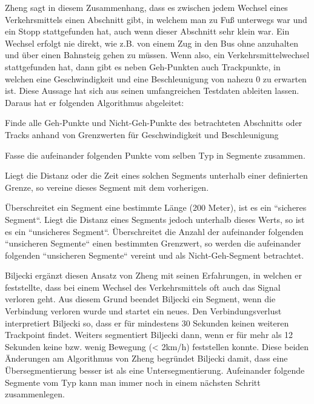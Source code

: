 Zheng sagt in diesem Zusammenhang, dass es zwischen jedem Wechsel eines Verkehrsmittels einen Abschnitt gibt, in welchem man zu Fuß unterwegs war und ein Stopp stattgefunden hat, auch wenn dieser Abschnitt sehr klein war. Ein Wechsel erfolgt nie direkt, wie z.B. von einem Zug in den Bus ohne anzuhalten und über einen Bahnsteig gehen zu müssen. Wenn also, ein Verkehrsmittelwechsel stattgefunden hat, dann gibt es neben Geh-Punkten auch Trackpunkte, in welchen eine Geschwindigkeit und eine Beschleunigung von nahezu 0 zu erwarten ist. Diese Aussage hat sich aus seinen umfangreichen Testdaten ableiten lassen. Daraus hat er folgenden Algorithmus abgeleitet:  \cite{zheng_understanding_2010}

\begin{pitemize}
\item Finde alle Geh-Punkte und Nicht-Geh-Punkte des betrachteten Abschnitts oder Tracks anhand von Grenzwerten für Geschwindigkeit und Beschleunigung 
\item Fasse die aufeinander folgenden Punkte vom selben Typ in Segmente zusammen.
\item Liegt die Distanz oder die Zeit eines solchen Segments unterhalb einer definierten Grenze, so vereine dieses Segment mit dem vorherigen.
\item Überschreitet ein Segment eine bestimmte Länge (200 Meter), ist es ein ``sicheres Segment``. Liegt die Distanz eines Segments jedoch unterhalb dieses Werts, so ist es ein ``unsicheres Segment``. Überschreitet die Anzahl der aufeinander folgenden ``unsicheren Segmente`` einen bestimmten Grenzwert, so werden die  aufeinander folgenden ``unsicheren Segmente`` vereint und als Nicht-Geh-Segment betrachtet.
\end{pitemize}

Biljecki ergänzt diesen Ansatz von Zheng mit seinen Erfahrungen, in welchen er feststellte, dass bei einem Wechsel des Verkehrsmittels oft auch das Signal verloren geht. Aus diesem Grund beendet Biljecki ein Segment, wenn die Verbindung verloren wurde und startet ein neues. Den Verbindungsverlust interpretiert Biljecki so, dass er für mindestens 30 Sekunden keinen weiteren Trackpoint findet. Weiters segmentiert Biljecki dann, wenn er für mehr als 12 Sekunden keine bzw. wenig Bewegung (< 2km/h) feststellen konnte. Diese beiden Änderungen am Algorithmus von Zheng begründet Biljecki damit, dass eine Übersegmentierung besser ist als eine Untersegmentierung. Aufeinander folgende Segmente vom Typ kann man immer noch in einem nächsten Schritt zusammenlegen. \cite{biljecki_transportation_2013}

